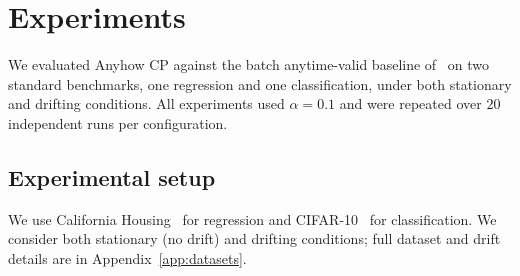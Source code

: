 \documentclass{uai2026} %
\newcommand{\1}{\mathbf{1}}
\begin{document}
\section{Experiments}
\label{sec:experiments}

We evaluated Anyhow CP against the batch anytime-valid baseline of~\citet{gauthier2025values} on two standard benchmarks, one regression and one classification, under both stationary and drifting conditions.
All experiments used $\alpha = 0.1$ and were repeated over $20$ independent runs per configuration.

\subsection{Experimental setup}
\label{sec:exp-setup}

We use California Housing~\citep{california_housing} for regression and CIFAR-10~\citep{cifar10} for classification.
We consider both stationary (no drift) and drifting conditions; full dataset and drift details are in Appendix~\ref{app:datasets}.


\end{document}
